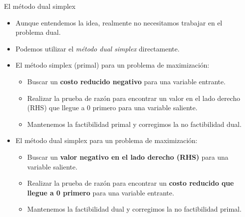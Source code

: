 \documentclass{beamer}
\begin{document}
\begin{frame}{El método dual simplex}
    \begin{itemize}
        \item Aunque entendemos la idea, realmente no necesitamos trabajar en el problema dual.
        \item Podemos utilizar el \textit{método dual simplex} directamente.
        \item El método simplex (primal) para un problema de maximización:
        \begin{itemize}
            \item Buscar un \textbf{costo reducido negativo} para una variable entrante.
            \item Realizar la prueba de razón para encontrar un valor en el lado derecho (RHS) que llegue a 0 primero para una variable saliente.
            \item Mantenemos la factibilidad primal y corregimos la no factibilidad dual.
        \end{itemize}
        \item El método dual simplex para un problema de maximización:
        \begin{itemize}
            \item Buscar un \textbf{valor negativo en el lado derecho (RHS)} para una variable saliente.
            \item Realizar la prueba de razón para encontrar un \textbf{costo reducido que llegue a 0 primero} para una variable entrante.
            \item Mantenemos la factibilidad dual y corregimos la no factibilidad primal.
        \end{itemize}
    \end{itemize}
\end{frame}
\end{document}
